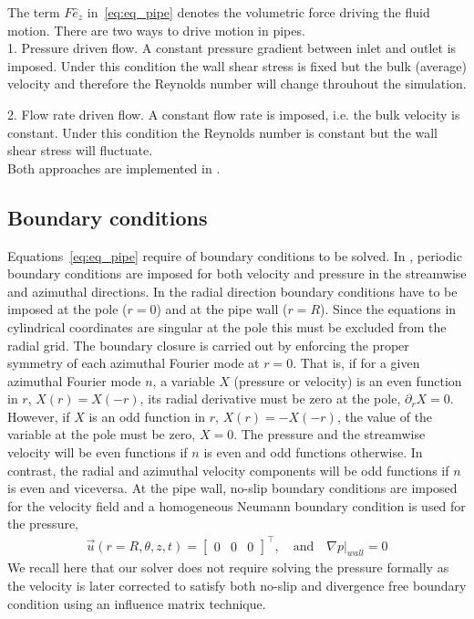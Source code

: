 \documentclass[a4paper, 11pt, DIV=11]{scrartcl}
\begin{document}
The term $F\hat{e}_z$ in~\ref{eq:eq_pipe} denotes the volumetric force driving
the fluid motion. There are two ways to drive motion in pipes.\\

1. Pressure driven flow. A constant pressure gradient between inlet and outlet
is imposed. Under this condition the wall shear stress is fixed but the
bulk (average) velocity and therefore the Reynolds number
will change throuhout the simulation.

2. Flow rate driven flow. A constant flow rate is imposed,
i.e. the bulk velocity is constant. Under this condition the Reynolds number
is constant but the wall shear stress will fluctuate.\\

Both approaches are implemented in \nsp.

\subsection{Boundary conditions}
\label{subsec:bcpipe}

Equations~\ref{eq:eq_pipe} require of boundary conditions to be solved. In \nsp,
periodic boundary conditions are imposed for both velocity and pressure in the streamwise
and azimuthal directions. In the radial direction boundary conditions have to be imposed
at the pole ($r=0$) and at the pipe wall ($r=R$). Since the equations in cylindrical
coordinates are singular at the pole this must be excluded from the radial grid.
The boundary closure is carried out by enforcing the proper symmetry of each azimuthal
Fourier mode at $r=0$. That is, if for a given azimuthal Fourier mode $n$,
a variable $X$ (pressure or velocity) is an even function in $r$, $X(r) = X(-r)$,
its radial derivative must be zero at the pole, $\partial_r X = 0$. However, if $X$ is
an odd function in $r$, $X(r) = -X(-r)$, the value of the variable at the pole must be zero,
$X = 0$. The pressure and the streamwise velocity will be even functions if
$n$ is even and odd functions otherwise. In contrast, the radial and azimuthal velocity
components will be odd functions if $n$ is even and viceversa. At the pipe wall,
no-slip boundary conditions are imposed for the velocity field and a homogeneous
Neumann boundary condition is used for the pressure,
\begin{align}
  \vec{u}(r=R, \theta, z, t) =
  \begin{bmatrix}
    0 & 0 & 0
  \end{bmatrix}^{\intercal},
  \hspace{1em}\text{and}\hspace{1em}
  \nabla p|_{wall} = 0
  \label{eq:pipe_wallBC}
\end{align}
We recall here that our solver does not require solving the pressure formally as the velocity is later corrected to satisfy
both no-slip and divergence free boundary condition using an influence matrix technique. 
\end{document}
